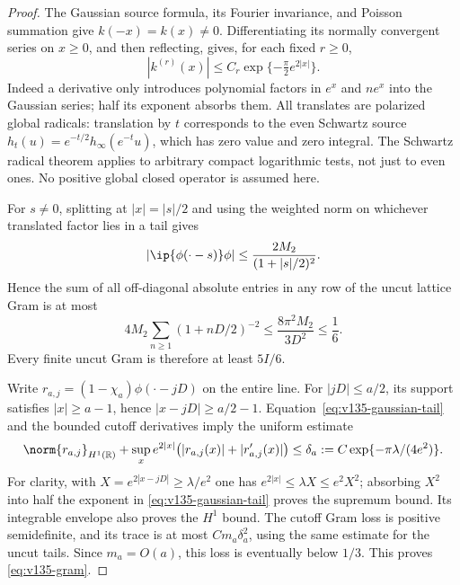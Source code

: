 \begin{proof}
The Gaussian source formula, its Fourier invariance, and Poisson
summation give $k(-x)=k(x)\ne0$.  Differentiating its normally
convergent series on $x\ge0$, and then reflecting, gives, for each
fixed $r\ge0$,
\begin{equation}\label{eq:v135-gaussian-tail}
 |k^{(r)}(x)|\le C_r\exp\{-\tfrac\pi2 e^{2|x|}\}.
\end{equation}
Indeed a derivative only introduces polynomial factors in $e^x$ and
$ne^x$ into the Gaussian series; half its exponent absorbs them.
All translates are polarized global radicals: translation by $t$
corresponds to the even Schwartz source
$h_t(u)=e^{-t/2}h_\infty(e^{-t}u)$, which has zero value and zero
integral.  The Schwartz radical theorem applies to arbitrary compact
logarithmic tests, not just to even ones.  No positive global closed
operator is assumed here.

For $s\ne0$, splitting at $|x|=|s|/2$ and using the weighted norm
on whichever translated factor lies in a tail gives
\[
 |\ip{\phi(\cdot-s)}\phi|
 \le\frac{2M_2}{(1+|s|/2)^2}.
\]
Hence the sum of all off-diagonal absolute entries in any row of
the uncut lattice Gram is at most
\[
 4M_2\sum_{n\ge1}(1+nD/2)^{-2}
 \le\frac{8\pi^2M_2}{3D^2}\le\frac16.
\]
Every finite uncut Gram is therefore at least $5I/6$.

Write $r_{a,j}=(1-\chi_a)\phi(\cdot-jD)$ on the entire line.
For $|jD|\le a/2$, its support satisfies $|x|\ge a-1$, hence
$|x-jD|\ge a/2-1$.  Equation~\eqref{eq:v135-gaussian-tail} and
the bounded cutoff derivatives imply the uniform estimate
\begin{equation}\label{eq:v135-weighted-tail}
 \norm{r_{a,j}}_{H^1(\mathbb R)}+
 \sup_x e^{2|x|}\bigl(|r_{a,j}(x)|+|r'_{a,j}(x)|\bigr)
 \le\delta_a:=C\exp\{-\pi\lambda/(4e^2)\}.
\end{equation}
For clarity, with $X=e^{2|x-jD|}\ge\lambda/e^2$ one has
$e^{2|x|}\le\lambda X\le e^2X^2$; absorbing $X^2$ into half
the exponent in \eqref{eq:v135-gaussian-tail} proves the supremum
bound.  Its integrable envelope also proves the $H^1$ bound.
The cutoff Gram loss is positive semidefinite, and its trace is
at most $Cm_a\delta_a^2$, using the same estimate for the
uncut tails.  Since $m_a=O(a)$, this loss is eventually below $1/3$.
This proves \eqref{eq:v135-gram}.


\end{proof}
